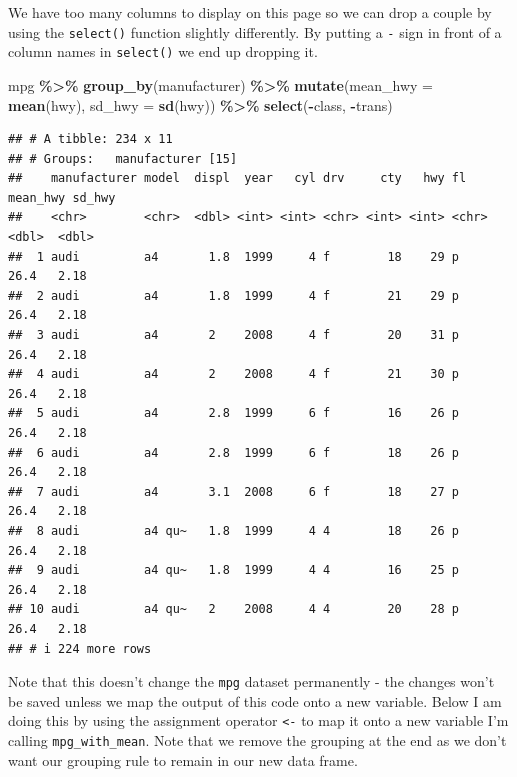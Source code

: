 \documentclass[
]{book}
\newenvironment{Shaded}{\begin{snugshade}}{\end{snugshade}}
\newcommand{\AttributeTok}[1]{\textcolor[rgb]{0.13,0.29,0.53}{#1}}
\newcommand{\FunctionTok}[1]{\textcolor[rgb]{0.13,0.29,0.53}{\textbf{#1}}}
\newcommand{\NormalTok}[1]{#1}
\newcommand{\SpecialCharTok}[1]{\textcolor[rgb]{0.81,0.36,0.00}{\textbf{#1}}}
\begin{document}
We have too many columns to display on this page so we can drop a couple by using the \texttt{select()} function slightly differently. By putting a \texttt{-} sign in front of a column names in \texttt{select()} we end up dropping it.

\begin{Shaded}
\begin{Highlighting}[]
\NormalTok{mpg }\SpecialCharTok{\%\textgreater{}\%} 
  \FunctionTok{group\_by}\NormalTok{(manufacturer) }\SpecialCharTok{\%\textgreater{}\%}
  \FunctionTok{mutate}\NormalTok{(}\AttributeTok{mean\_hwy =} \FunctionTok{mean}\NormalTok{(hwy), }\AttributeTok{sd\_hwy =} \FunctionTok{sd}\NormalTok{(hwy)) }\SpecialCharTok{\%\textgreater{}\%}
  \FunctionTok{select}\NormalTok{(}\SpecialCharTok{{-}}\NormalTok{class, }\SpecialCharTok{{-}}\NormalTok{trans)}
\end{Highlighting}
\end{Shaded}

\begin{verbatim}
## # A tibble: 234 x 11
## # Groups:   manufacturer [15]
##    manufacturer model  displ  year   cyl drv     cty   hwy fl    mean_hwy sd_hwy
##    <chr>        <chr>  <dbl> <int> <int> <chr> <int> <int> <chr>    <dbl>  <dbl>
##  1 audi         a4       1.8  1999     4 f        18    29 p         26.4   2.18
##  2 audi         a4       1.8  1999     4 f        21    29 p         26.4   2.18
##  3 audi         a4       2    2008     4 f        20    31 p         26.4   2.18
##  4 audi         a4       2    2008     4 f        21    30 p         26.4   2.18
##  5 audi         a4       2.8  1999     6 f        16    26 p         26.4   2.18
##  6 audi         a4       2.8  1999     6 f        18    26 p         26.4   2.18
##  7 audi         a4       3.1  2008     6 f        18    27 p         26.4   2.18
##  8 audi         a4 qu~   1.8  1999     4 4        18    26 p         26.4   2.18
##  9 audi         a4 qu~   1.8  1999     4 4        16    25 p         26.4   2.18
## 10 audi         a4 qu~   2    2008     4 4        20    28 p         26.4   2.18
## # i 224 more rows
\end{verbatim}

Note that this doesn't change the \texttt{mpg} dataset permanently - the changes won't be saved unless we map the output of this code onto a new variable. Below I am doing this by using the assignment operator \texttt{\textless{}-} to map it onto a new variable I'm calling \texttt{mpg\_with\_mean}. Note that we remove the grouping at the end as we don't want our grouping rule to remain in our new data frame.
\end{document}
